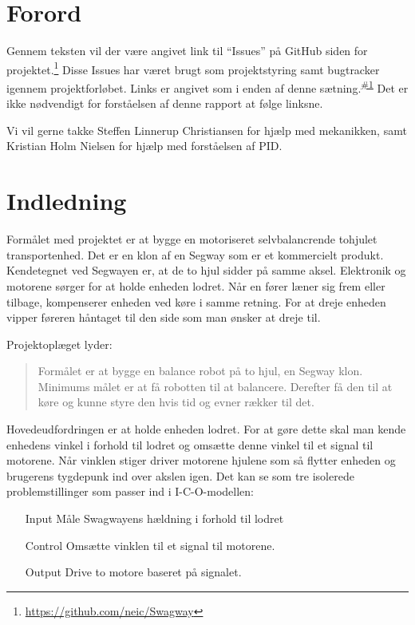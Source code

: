 \documentclass[a4paper,oneside,article,danish,table]{memoir}
\newcommand{\issue}[1]{\textsuperscript{\textcolor{blue!80!black}{\href{https://github.com/neic/Swagway/issues/#1}{\##1}}}}
\begin{document}
\vfill
\begin{abstract} %
\end{abstract}\vfill
\noindent
\begin{tabular*}{\textwidth}{@{\extracolsep{\fill}} ll}

\end{tabular*}
\thispagestyle{empty}
\clearpage

\chapter*{Forord}\label{chap:for}
Gennem teksten vil der være angivet link til “Issues” på GitHub siden for projektet.\footnote{\url{https://github.com/neic/Swagway}} Disse Issues har været brugt som projektstyring samt bugtracker igennem projektforløbet. Links er angivet som i enden af denne sætning.\issue{1} Det er ikke nødvendigt for forståelsen af denne rapport at følge linksne.

Vi vil gerne takke Steffen Linnerup Christiansen for hjælp med mekanikken, samt Kristian Holm Nielsen for hjælp med forståelsen af PID.

\clearpage \setcounter{tocdepth}{1} \tableofcontents \clearpage

\chapter{Indledning}\label{chap:ind}

Formålet med projektet er at bygge en motoriseret selvbalancrende tohjulet transportenhed. Det er en klon af en Segway som er et kommercielt produkt. Kendetegnet ved Segwayen er, at de to hjul sidder på samme aksel. Elektronik og motorene sørger for at holde enheden lodret. Når en fører læner sig frem eller tilbage, kompenserer enheden ved køre i samme retning. For at dreje enheden vipper føreren håntaget til den side som man ønsker at dreje til.

Projektoplæget lyder:
\begin{quote}
  Formålet er at bygge en balance robot på to hjul, en Segway klon. Minimums målet er at få robotten til at balancere. Derefter få den til at køre og kunne styre den hvis tid og evner rækker til det.
\end{quote}

Hovedeudfordringen er at holde enheden lodret. For at gøre dette skal man kende enhedens vinkel i forhold til lodret og omsætte denne vinkel til et signal til motorene. Når vinklen stiger driver motorene hjulene som så flytter enheden og brugerens tygdepunk ind over akslen igen.
Det kan se som tre isolerede problemstillinger som passer ind i I-C-O-modellen:
\begin{itemize}
\item[Input] Måle Swagwayens hældning i forhold til lodret
\item[Control] Omsætte vinklen til et signal til motorene.
\item[Output] Drive to motore baseret på signalet.
\end{itemize}
\end{document}

